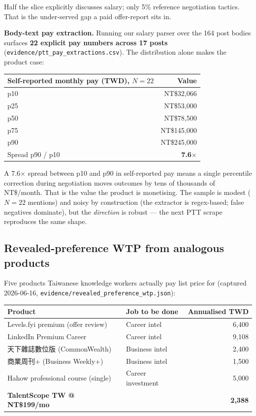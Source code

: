\documentclass[11pt,a4paper]{article}
\begin{document}
Half the slice explicitly discusses salary; only 5\% reference
negotiation tactics. That is the under-served gap a paid offer-report
sits in.

\textbf{Body-text pay extraction.} Running our salary parser over the
164 post bodies surfaces \textbf{22 explicit pay numbers across 17
posts} (\texttt{evidence/ptt\_pay\_extractions.csv}). The distribution
alone makes the product case:

\begin{center}\small
\begin{tabular}{lr}
\toprule
\textbf{Self-reported monthly pay (TWD), $N=22$} & \textbf{Value} \\
\midrule
p10 & NT\$32,066 \\
p25 & NT\$53,000 \\
p50 & NT\$78,500 \\
p75 & NT\$145,000 \\
p90 & NT\$245,000 \\
\midrule
Spread p90 / p10 & \textbf{7.6$\times$} \\
\bottomrule
\end{tabular}
\end{center}

A 7.6$\times$ spread between p10 and p90 in self-reported pay means a
single percentile correction during negotiation moves outcomes by tens
of thousands of NT\$/month. That is the value the product is monetising.
The sample is modest ($N{=}22$ mentions) and noisy by construction (the
extractor is regex-based; false negatives dominate), but the
\emph{direction} is robust --- the next PTT scrape reproduces the same
shape.

\subsection{Revealed-preference WTP from analogous products}

Five products Taiwanese knowledge workers actually pay list price for
(captured 2026-06-16, \texttt{evidence/revealed\_preference\_wtp.json}):

\begin{center}\small
\begin{tabular}{llr}
\toprule
\textbf{Product} & \textbf{Job to be done} & \textbf{Annualised TWD} \\
\midrule
Levels.fyi premium (offer review)     & Career intel       & 6{,}400 \\
LinkedIn Premium Career               & Career intel       & 9{,}108 \\
天下雜誌數位版 (CommonWealth)         & Business intel     & 2{,}400 \\
商業周刊+ (Business Weekly+)          & Business intel     & 1{,}500 \\
Hahow professional course (single)    & Career investment  & 5{,}000 \\
\midrule
\textbf{TalentScope TW @ NT\$199/mo}    &                    & \textbf{2{,}388} \\
\bottomrule
\end{tabular}
\end{center}
\end{document}
